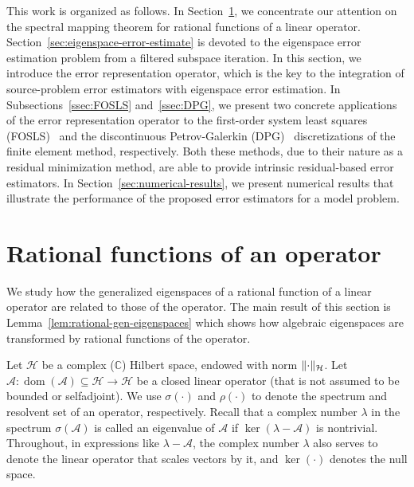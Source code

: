 \documentclass[12pt, oneside, reqno]{amsart}
\theoremstyle{remark}
\DeclareMathOperator{\dom}{dom}
\newcommand{\CC}{\mathbb{C}}
\DeclarePairedDelimiter{\norm}{\lVert}{\rVert}
\newcommand{\Ac}{\mathcal{A}}
\newcommand{\Hc}{\mathcal{H}}
\begin{document}
This work is organized as follows.
In Section~\ref{sec:rational-functions}, we concentrate our attention on the
spectral mapping theorem for rational functions of a linear operator.
Section~\ref{sec:eigenspace-error-estimate} is devoted to the eigenspace
error estimation problem from a filtered subspace iteration.
In this section, we introduce the error representation operator, which is the
key to the integration of source-problem error estimators with eigenspace
error estimation.
In Subsections~\ref{ssec:FOSLS} and~\ref{ssec:DPG}, we present two concrete
applications of the error representation operator to the first-order system
least squares (FOSLS)~\cite{CaiEtAl1994-1, CaiEtAl1997-1}
and the discontinuous Petrov-Galerkin (DPG)~\cite{DemGop2013-1, DemGop2017-1, DemGop2025-1}
discretizations of the finite element method, respectively.
Both these methods, due to their nature as a residual
minimization method, are able to provide intrinsic residual-based error estimators.
In Section~\ref{sec:numerical-results}, we present numerical results
that illustrate the performance of the proposed error estimators for a
model problem.


\section{Rational functions of an operator} \label{sec:rational-functions}


We study how the generalized eigenspaces of a rational function of a
linear operator are related to those  of the operator.
The main result of this section is Lemma~\ref{lem:rational-gen-eigenspaces} which shows how algebraic eigenspaces are transformed by rational functions of the operator.

Let \(\Hc\) be a complex ($\CC$) Hilbert space, endowed with norm
\(\norm{\cdot}_\Hc\). Let $\Ac : \dom (\Ac) \subseteq \Hc \to \Hc$ be a
closed linear operator (that is not assumed to be bounded or
selfadjoint).  We use $\sigma(\cdot)$ and $\rho(\cdot)$ to denote the
spectrum and resolvent set of an operator, respectively.  Recall that
a complex number $\lambda$ in the spectrum $\sigma(\Ac)$ is called an
eigenvalue of $\Ac$ if $\ker( \lambda - \Ac)$ is
nontrivial. Throughout, in expressions like $\lambda - \Ac$, the
complex number $\lambda$ also serves to denote the linear operator
that scales vectors by it, and
$\ker(\cdot)$ denotes the null space.  
\end{document}

